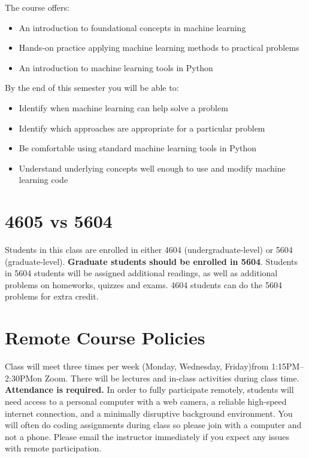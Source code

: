 \documentclass[10pt]{memoir}
\def\mymeetingdays{Monday, Wednesday, Friday}
\def\mymeetingtimes{1:15PM--2:30PM}
\begin{document}
The course offers:

\begin{itemize}
\item An introduction to foundational concepts in machine learning
\item Hands-on practice applying machine learning methods to practical problems
\item An introduction to machine learning tools in Python 
\end{itemize}

By the end of this semester you will be able to:
\begin{itemize}
\item Identify when machine learning can help solve a problem
\item Identify which approaches are appropriate for a particular problem
\item Be comfortable using standard machine learning tools in Python
\item Understand underlying concepts well enough to use and modify machine learning code
\end{itemize}

\section{\textbf{4605 vs 5604}}

Students in this class are enrolled in either 4604 (undergraduate-level) or 5604 (graduate-level). \textbf{Graduate students should be enrolled in 5604}. Students in 5604 students will be assigned additional readings, as well as additional problems on homeworks, quizzes and exams. 4604 students can do the 5604 problems for extra credit.

\section{\textbf{Remote Course Policies}}
Class will meet three times per week (\mymeetingdays)\space from \mymeetingtimes\space on Zoom. There will be lectures and in-class activities during class time. \textbf{Attendance is required.} 
In order to fully participate remotely, students will need access to a personal computer with a web camera, a reliable high-speed internet connection, and a minimally disruptive background environment. 
{You will often do coding assignments during class so please join with a computer and not a phone}.
Please email the instructor immediately if you expect any issues with remote participation.
\end{document}
